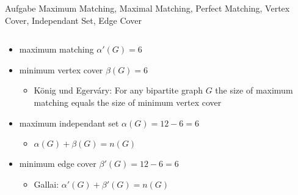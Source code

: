 \begin{frame}[allowframebreaks]{Aufgabe \thesection}{\scriptsize Maximum Matching, Maximal Matching, Perfect Matching, Vertex Cover, Independant Set, Edge Cover}
\begin{solutionnoinc}
  \end{solutionnoinc}
  \begin{solution}
  \end{solution}
  \begin{solution}
    \begin{columns}
      \begin{column}{0.5\textwidth}
        \begin{itemize}
          \item maximum matching $\alpha'(G) = 6$
          \item minimum vertex cover $\beta(G) = 6$
          \begin{itemize}
            \item \alert{König und Egerváry:} For any bipartite graph $G$ the size of maximum matching equals the size of minimum vertex cover
          \end{itemize}
          \item maximum independant set $\alpha(G) = 12 - 6 = 6$ 
          \begin{itemize}
            \item $\alpha(G) + \beta(G) = n(G)$
          \end{itemize}
          \item minimum edge cover $\beta'(G) = 12 - 6 = 6$
          \begin{itemize}
            \item \alert{Gallai:} $\alpha'(G) + \beta'(G) = n(G)$
          \end{itemize}
        \end{itemize}
      \end{column}
      \begin{column}{0.5\textwidth}
      \end{column}
    \end{columns}
  \end{solution}
  \begin{solutionnoinc}
  \end{solutionnoinc}
  \begin{solution}
  \end{solution}
\end{frame}
